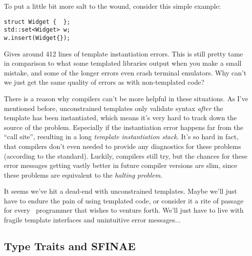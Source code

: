 To put a little bit more salt to the wound, consider this simple example:

    \begin{lstlisting}
struct Widget {  };
std::set<Widget> w;
w.insert(Widget{}); \end{lstlisting}

\noindent Gives around 412 lines of template instantiation errors. This is still pretty tame in comparison to what some templated libraries output when you make a small mistake, and some of the longer errors even crash terminal emulators. Why can't we just get the same quality of errors as with non-templated code?

There is a reason why compilers can't be more helpful in these situations. As I've mentioned before, unconstrained templates only validate syntax \emph{after} the template has been instantiated, which means it's very hard to track down the source of the problem. Especially if the instantiation error happens far from the ``call site'', resulting in a long \emph{template instantiation stack}. It's so hard in fact, that compilers don't even needed to provide any diagnostics for these problems (according to the standard). Luckily, compilers still try, but the chances for these error messages getting vastly better in future compiler versions are slim, since these problems are equivalent to the \emph{halting problem}.

It seems we've hit a dead-end with unconstrained templates. Maybe we'll just have to endure the pain of using templated code, or consider it a rite of passage for every \Cpp\ programmer that wishes to venture forth. We'll just have to live with fragile template interfaces and unintuitive error messages...

\newpage

    

\subsection{Type Traits and SFINAE} \label{sec:type_traits_and_sfinae}

